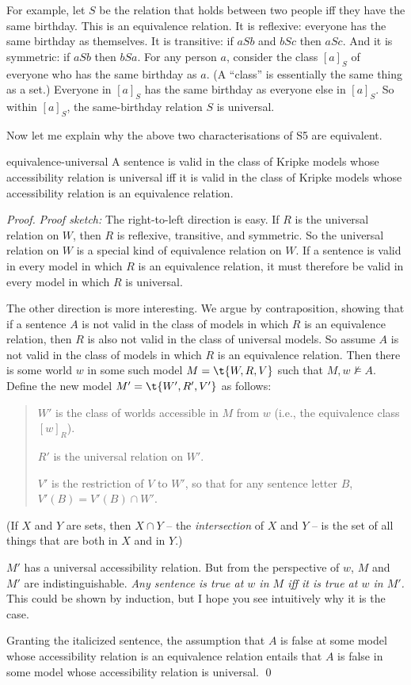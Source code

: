 For example, let $S$ be the relation that holds between two people iff they have
the same birthday. This is an equivalence relation. It is reflexive: everyone
has the same birthday as themselves. It is transitive: if $aSb$ and $bSc$ then
$aSc$. And it is symmetric: if $aSb$ then $bSa$. For any person $a$, consider
the class $[a]_S$ of everyone who has the same birthday as $a$. (A ``class'' is
essentially the same thing as a set.) Everyone in $[a]_S$ has the same birthday
as everyone else in $[a]_S$. So within $[a]_S$, the same-birthday relation $S$
is universal.

Now let me explain why the above two characterisations of S5 are equivalent.

\begin{observation}{equivalence-universal}
  A sentence is valid in the class of Kripke models whose accessibility relation
  is universal iff it is valid in the class of Kripke models whose accessibility
  relation is an equivalence relation.
\end{observation}
%
\begin{proof}
  \emph{Proof sketch:} The right-to-left direction is easy. If $R$ is the universal
  relation on $W$, then $R$ is reflexive, transitive, and symmetric. So the
  universal relation on $W$ is a special kind of equivalence relation on $W$. If
  a sentence is valid in every model in which $R$ is an equivalence relation, it
  must therefore be valid in every model in which $R$ is universal.

  The other direction is more interesting. We argue by contraposition, showing
  that if a sentence $A$ is not valid in the class of models in which $R$ is an
  equivalence relation, then $R$ is also not valid in the class of universal
  models. So assume $A$ is not valid in the class of models in which $R$ is an
  equivalence relation. Then there is some world $w$ in some such model
  $M = \t{W,R,V}$ such that $M,w \not\models A$. Define the new model
  $M' = \t{W',R',V'}$ as follows:
  \begin{quote}
    $W'$ is the class of worlds accessible in $M$ from $w$ (i.e., the
    equivalence class $[w]_R$).

    $R'$ is the universal relation on $W'$.

    $V'$ is the restriction of $V$ to $W'$, so that for any sentence letter $B$,
    $V'(B) = V'(B) \cap W'$.
  \end{quote}
  (If $X$ and $Y$ are sets, then $X \cap Y$ -- the \emph{intersection} of $X$ and
  $Y$ -- is the set of all things that are both in $X$ and in $Y$.)

  $M'$ has a universal accessibility relation. But from the perspective of $w$,
  $M$ and $M'$ are indistinguishable. \emph{Any sentence is true at $w$ in $M$ iff
    it is true at $w$ in $M'$.} This could be shown by induction, but I hope you
  see intuitively why it is the case.

  Granting the italicized sentence, the assumption that $A$ is false at some model
  whose accessibility relation is an equivalence relation entails that $A$ is
  false in some model whose accessibility relation is universal. \qed
\end{proof}

